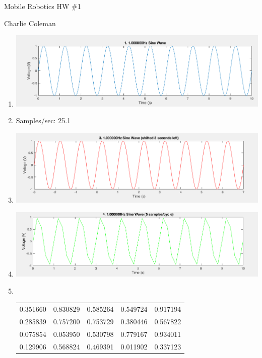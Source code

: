 \documentclass{article}
\begin{document}
	\hfill \begin{large}Mobile Robotics HW \#1\end{large} \hfill Charlie Coleman
	
	\begin{enumerate}
		\item \includegraphics[width=5in]{1}
		\item Samples/sec: 25.1
		\item \includegraphics[width=5in]{3}
		\item \includegraphics[width=5in]{4}
		\item ~
		
		\begin{tabular}{ccccc}
			0.351660 & 0.830829 & 0.585264 & 0.549724 & 0.917194 \\
			0.285839 & 0.757200 & 0.753729 & 0.380446 & 0.567822 \\
			0.075854 & 0.053950 & 0.530798 & 0.779167 & 0.934011 \\
			0.129906 & 0.568824 & 0.469391 & 0.011902 & 0.337123
		\end{tabular}
	\end{enumerate}

	
	
	~\\
	
	
\end{document}
